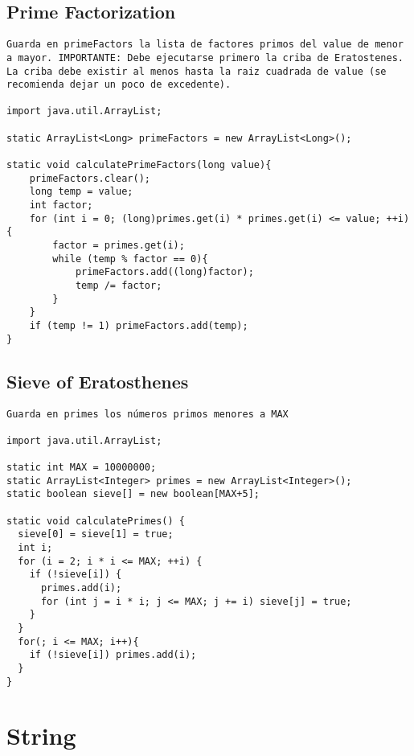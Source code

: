 \documentclass[10pt,letterpaper,twocolumn,twosided]{article}
\begin{document}
\subsection{Prime Factorization}
\begin{lstlisting}
Guarda en primeFactors la lista de factores primos del value de menor a mayor. IMPORTANTE: Debe ejecutarse primero la criba de Eratostenes.  La criba debe existir al menos hasta la raiz cuadrada de value (se  recomienda dejar un poco de excedente).

import java.util.ArrayList;

static ArrayList<Long> primeFactors = new ArrayList<Long>();

static void calculatePrimeFactors(long value){
	primeFactors.clear();
	long temp = value;
	int factor;
	for (int i = 0; (long)primes.get(i) * primes.get(i) <= value; ++i){
		factor = primes.get(i);
		while (temp % factor == 0){
			primeFactors.add((long)factor);
			temp /= factor;
		}
	}
	if (temp != 1) primeFactors.add(temp);
}
\end{lstlisting}

\subsection{Sieve of Eratosthenes}
\begin{lstlisting}
Guarda en primes los números primos menores a MAX

import java.util.ArrayList;

static int MAX = 10000000;
static ArrayList<Integer> primes = new ArrayList<Integer>();
static boolean sieve[] = new boolean[MAX+5];
	
static void calculatePrimes() {
  sieve[0] = sieve[1] = true;
  int i;
  for (i = 2; i * i <= MAX; ++i) {
    if (!sieve[i]) {
      primes.add(i);
      for (int j = i * i; j <= MAX; j += i) sieve[j] = true;
    }
  }
  for(; i <= MAX; i++){
  	if (!sieve[i]) primes.add(i);
  }
}
\end{lstlisting}

\section{String}
\end{document}
